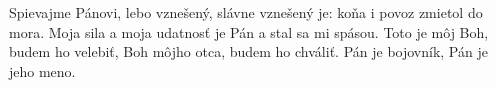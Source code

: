 Spievajme Pánovi,
lebo vznešený, slávne vznešený je:
koňa i povoz zmietol do mora.
Moja sila a moja udatnosť je Pán
a stal sa mi spásou.
\versseparator
Toto je môj Boh, budem ho velebiť,
Boh môjho otca, budem ho chváliť.
\versseparator
Pán je bojovník,
Pán je jeho meno.